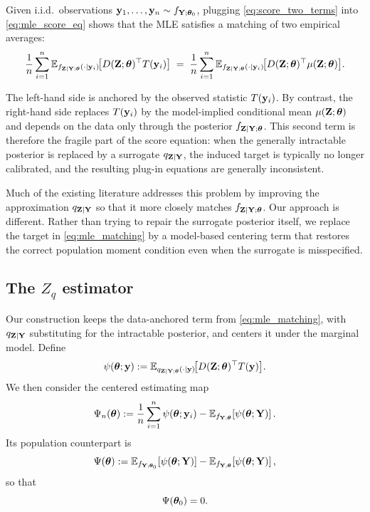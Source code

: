 \documentclass[twoside,11pt]{article}
\begin{document}
Given i.i.d.\ observations ${\bf y}_1,\dots,{\bf y}_n \sim f_{{\bf Y};{\bm{\theta}}_0}$, plugging \eqref{eq:score_two_terms}
into \eqref{eq:mle_score_eq} shows that the MLE satisfies a matching of two empirical averages:
\begin{equation}
\frac{1}{n}\sum_{i=1}^n
\mathbb{E}_{f_{{\bf Z}\mid{\bf Y};{\bm{\theta}}}(\cdot\mid {\bf y}_i)}\!\big[D({\bf Z};{\bm{\theta}})^\top T({\bf y}_i)\big]
\;=\;
\frac{1}{n}\sum_{i=1}^n
\mathbb{E}_{f_{{\bf Z}\mid{\bf Y};{\bm{\theta}}}(\cdot\mid {\bf y}_i)}\!\big[D({\bf Z};{\bm{\theta}})^\top \mu({\bf Z};{\bm{\theta}})\big].
\label{eq:mle_matching}
\end{equation}

The left-hand side is anchored by the observed statistic $T({\bf y}_i)$. By contrast, the
right-hand side replaces $T({\bf y}_i)$ by the model-implied conditional mean
$\mu({\bf Z};{\bm{\theta}})$ and depends on the data only through the posterior
$f_{{\bf Z}\mid{\bf Y};{\bm{\theta}}}$. This second term is therefore the fragile part of the score equation:
when the generally intractable posterior is replaced by a surrogate
$q_{{\bf Z}\mid{\bf Y}}$, the induced target is typically no longer calibrated, and the resulting
plug-in equations are generally inconsistent.

Much of the existing literature addresses this problem by improving the approximation
$q_{{\bf Z}\mid{\bf Y}}$ so that it more closely matches $f_{{\bf Z}\mid{\bf Y};{\bm{\theta}}}$. Our approach is
different. Rather than trying to repair the surrogate posterior itself, we replace the
target in \eqref{eq:mle_matching} by a model-based centering term that restores the
correct population moment condition even when the surrogate is misspecified.

\subsection{The $Z_q$ estimator}
\label{sec:zq_estimator}

Our construction keeps the data-anchored term from \eqref{eq:mle_matching}, with
$q_{{\bf Z}\mid{\bf Y}}$ substituting for the intractable posterior, and centers it under the
marginal model. Define
\begin{equation}
\psi({\bm{\theta}};{\bf y})
:=
\mathbb{E}_{q_{{\bf Z}\mid{\bf Y};{\bm{\theta}}}(\cdot\mid {\bf y})}\!\big[D({\bf Z};{\bm{\theta}})^\top T({\bf y})\big].
\label{eq:psi_theta_dep_method}
\end{equation}
We then consider the centered estimating map
\begin{equation}
\Psi_n({\bm{\theta}})
:=
\frac{1}{n}\sum_{i=1}^n \psi({\bm{\theta}};{\bf y}_i)
-
\mathbb{E}_{f_{{\bf Y};{\bm{\theta}}}}\!\left[\psi({\bm{\theta}};{\bf Y})\right].
\label{eq:Psi_n_general}
\end{equation}
Its population counterpart is
\[
\Psi({\bm{\theta}})
:=
\mathbb E_{f_{{\bf Y};{\bm{\theta}}_0}}\!\left[\psi({\bm{\theta}};{\bf Y})\right]
-
\mathbb E_{f_{{\bf Y};{\bm{\theta}}}}\!\left[\psi({\bm{\theta}};{\bf Y})\right],
\]
so that
\[
\Psi({\bm{\theta}}_0)=0.
\]
\end{document}
